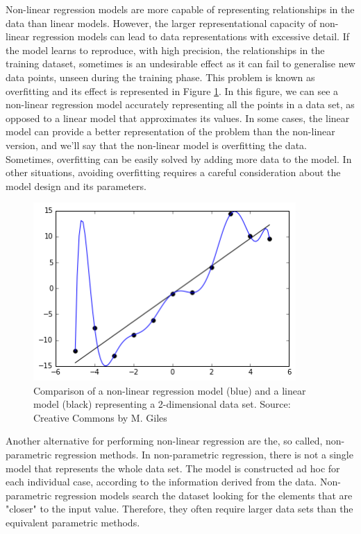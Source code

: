 Non-linear regression models are more capable of representing relationships in the data than linear models. However, the larger representational capacity of non-linear regression models can lead to data representations with excessive detail. If the model learns to reproduce, with high precision, the relationships in the training dataset, sometimes is an undesirable effect as it can fail to generalise new data points, unseen during the training phase. This problem is known as overfitting \citep{hawkins2004problem} and its effect is represented in Figure \ref{overfitting}. In this figure, we can see a non-linear regression model accurately representing all the points in a data set, as opposed to a linear model that approximates its values. In some cases, the linear model can provide a better representation of the problem than the non-linear version, and we'll say that the non-linear model is overfitting the data. Sometimes, overfitting can be easily solved by adding more data to the model. In other situations, avoiding overfitting requires a careful consideration about the model design and its parameters.

\medskip

\begin{figure}[h]
 \centerline{\includegraphics[width=10cm]{overfitting.png}} \caption{Comparison of a non-linear regression model (blue) and a linear model (black) representing a 2-dimensional data set. Source: Creative Commons by M. Giles}\label{overfitting}
\end{figure}

Another alternative for performing non-linear regression are the, so called, non-parametric regression methods. In non-parametric regression, there is not a single model that represents the whole data set. The model is constructed ad hoc for each individual case, according to the information derived from the data. Non-parametric regression models search the dataset looking for the elements that are "closer" to the input value. Therefore, they often require larger data sets than the equivalent parametric methods. 

